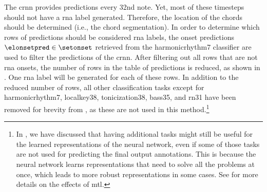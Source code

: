 
The \gls{crnn} provides predictions every \gls{32nd} note.
Yet, most of these timesteps should not have a \gls{rna}
label generated. Therefore, the location of the chords
should be determined (i.e., the chord segmentation). In
order to determine which rows of predictions should be
considered \gls{rna} labels, the onset predictions
$\elonsetpred \in \setonset$ retrieved from the
\gls{harmonicrhythm7} classifier are used to filter the
predictions of the \gls{crnn}. After filtering out all rows
that are not \gls{rna} onsets, the number of rows in the
table of predictions is reduced, as shown in
. One \gls{rna} label
will be generated for each of these rows. In addition to the
reduced number of rows, all other classification tasks
except for \gls{harmonicrhythm7}, \gls{localkey38},
\gls{tonicization38}, \gls{bass35}, and \gls{rn31} have been
removed for brevity from
, as these are not used
in this method.\footnote{In
\textcite{napoleslopez2021augmentednet}, we have discussed
that having additional tasks might still be useful for the
learned representations of the neural network, even if some
of those tasks are not used for predicting the final output
annotations. This is because the neural network learns
representations that need to solve all the problems at once,
which leads to more robust representations in some cases.
See \textcite{ruder2017overview} for more details on the
effects of \gls{mtl}.}

